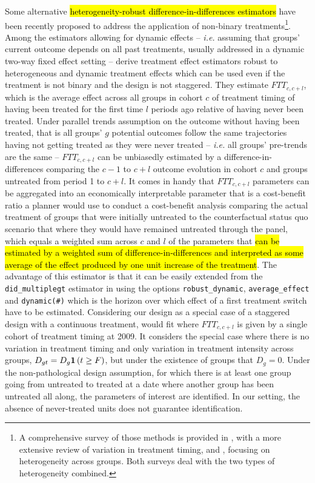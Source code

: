 \documentclass[11pt]{article}
\begin{document}
Some alternative \hl{heterogeneity-robust difference-in-differences estimators} have been recently proposed to address the application of non-binary treatments\footnote{A comprehensive survey of those methods is provided in \citet{bib:roth2022}, with a more extensive review of variation in treatment timing, and \citet{bib:dechaisemartin2022a}, focusing on heterogeneity across groups. Both surveys deal with the two types of heterogeneity combined.}. Among the estimators allowing for dynamic effects -- \textit{i.e.} assuming that groups' current outcome depends on all past treatments, usually addressed in a dynamic two-way fixed effect setting -- \citet{bib:dechaisemartin2021} derive treatment effect estimators robust to heterogeneous and dynamic treatment effects which can be used even if the treatment is not binary and the design is not staggered. 
They estimate $FTT_{c,c+l}$, which is the average effect across all groups in cohort $c$ of treatment timing of having been treated for the first time $l$ periods ago relative of having never been treated. Under parallel trends assumption on the outcome without having been treated, that is all groups' $g$ potential outcomes follow the same trajectories having not getting treated as they were never treated -- \textit{i.e.} all groups' pre-trends are the same -- $FTT_{c,c+l}$ can be unbiasedly estimated by a difference-in-differences comparing the $c-1$ to $c+l$ outcome evolution in cohort $c$ and groups untreated from period 1 to $c+l$. 
It comes in handy that $FTT_{c,c+l}$ parameters can be aggregated into an economically interpretable parameter that is a cost-benefit ratio a planner would use to conduct a cost-benefit analysis comparing the actual treatment of groups that were initially untreated to the counterfactual status quo scenario that where they would have remained untreated through the panel, which equals a weighted sum across $c$ and $l$ of the parameters that \hl{can be estimated by a weighted sum of difference-in-differences and interpreted as some average of the effect produced by one unit increase of the treatment}. The advantage of this estimator is that it can be easily extended from the \texttt{did\_multiplegt} estimator in \citet{bib:dechaisemartin2020} using the options \texttt{robust\_dynamic}, \texttt{average\_effect} and \texttt{dynamic(\#)} which is the horizon over which effect of a first treatment switch have to be estimated.
Considering our design as a special case of a staggered design with a continuous treatment, \citet{bib:dechaisemartin2021} would fit where $FTT_{c,c+l}$ is given by a single cohort of treatment timing at 2009. It considers the special case where there is no variation in treatment timing and only variation in treatment intensity across groups, $D_{gt} = D_{g} \mathbf{1}\left( t \geq F \right)$, but under the existence of groups that $D_{g} = 0$. Under the non-pathological design assumption, for which there is at least one group going from untreated to treated at a date where another group has been untreated all along, the parameters of interest are identified. In our setting, the absence of never-treated units does not guarantee identification.
\end{document}
